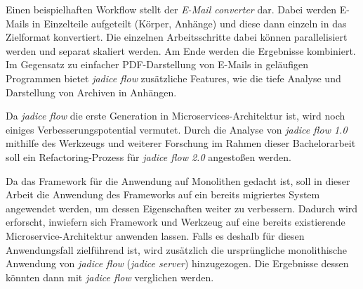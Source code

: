Einen beispielhaften Workflow stellt der \emph{E-Mail converter} dar.
Dabei werden E-Mails in Einzelteile aufgeteilt (Körper, Anhänge) und diese dann einzeln in das Zielformat konvertiert.
Die einzelnen Arbeitsschritte dabei können parallelisiert werden und separat skaliert werden.
Am Ende werden die Ergebnisse kombiniert.
Im Gegensatz zu einfacher PDF-Darstellung von E-Mails in geläufigen Programmen bietet \emph{jadice flow} zusätzliche Features, wie die tiefe Analyse und Darstellung von Archiven in Anhängen.

Da \emph{jadice flow} die erste Generation in Microservices-Architektur ist, wird noch einiges Verbesserungspotential vermutet.
Durch die Analyse von \emph{jadice flow 1.0} mithilfe des Werkzeugs und weiterer Forschung im Rahmen dieser Bachelorarbeit soll ein Refactoring-Prozess für \emph{jadice flow 2.0} angestoßen werden.

Da das Framework für die Anwendung auf Monolithen gedacht ist, soll in dieser Arbeit die Anwendung des Frameworks auf ein bereits migriertes System angewendet werden, um dessen Eigenschaften weiter zu verbessern.
Dadurch wird erforscht, inwiefern sich Framework und Werkzeug auf eine bereits existierende Microservice-Architektur anwenden lassen.
Falls es deshalb für diesen Anwendungsfall zielführend ist, wird zusätzlich die ursprüngliche monolithische Anwendung von \emph{jadice flow} (\emph{jadice server}) hinzugezogen.
Die Ergebnisse dessen könnten dann mit \emph{jadice flow} verglichen werden.



